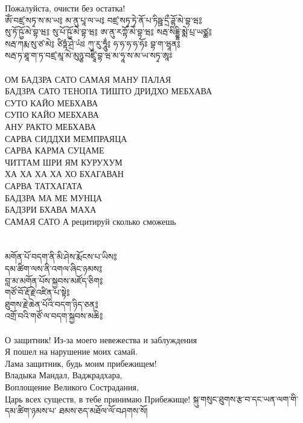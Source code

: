 Пожалуйста, очисти без остатка!\\
\ru
\newpage
\ti
ཨོཾ་བཛྲ་སཏྭ་ས་མ་ཡ༔ མ་ནུ་པཱ་ལ་ཡ༔ བཛྲ་སཏྭ་ཏྭེ་ནོ་པ་ཏིཥྛ་དྲྀ་ཌྷོ་མེ་བྷ་ཝ༔ \\
སུ་ཏོ་ཥྱོ་མེ་བྷ་ཝ༔ སུ་པོ་ཥྱོ་མེ་བྷ་ཝ༔ ཨ་ནུ་རཀྟོ་མེ་བྷ་ཝ༔ སརྦ་སིདྡྷི་མྨེ་པྲ་ཡཙྪ༔ \\
སརྦ་ཀརྨ་སུ་ཙ་མེ༔ ཙིཏྟཾ་ཤྲེ་ཡཾཿ ཀུ་རུ་ཧཱུྂ༔ ཧ་ཧ་ཧ་ཧ་ཧོཿ བྷ་ག་ཝཱན༔ \\
སརྦ་ཏ་ཐཱ་ག་ཏ་བཛྲ་མཱ་མེ་མུཉྩ་བཛྲཱི་བྷ་ཝ་མ་ཧཱ་ས་མ་ཡ་སཏྭ་ཨཱཿ\\
\\
\ru
ОМ БАДЗРА САТО САМАЯ МАНУ ПАЛАЯ\\
БАДЗРА САТО ТЕНОПА ТИШТО ДРИДХО МЕБХАВА\\
СУТО КАЙО МЕБХАВА\\
СУПО КАЙО МЕБХАВА\\
АНУ РАКТО МЕБХАВА\\
САРВА СИДДХИ МЕМПРАЯЦА\\
САРВА КАРМА СУЦАМЕ\\
ЧИТТАМ ШРИ ЯМ КУРУХУМ\\
ХА ХА ХА ХА ХО БХАГАВАН\\
САРВА ТАТХАГАТА\\
БАДЗРА МА МЕ МУНЦА\\
БАДЗРИ БХАВА МАХА\\
САМАЯ САТО А \hspace{2cm} \scriptsize рецитируй сколько сможешь \normalsize \\
\\
\\
\ti
མགོན་པོ་བདག་ནི་མི་ཤེས་རྨོངས་པ་ཡིས༔\\
དམ་ཚིག་ལས་ནི་འགལ་ཞིང་ཉམས༔ \\
བླ་མ་མགོན་པོས་སྐྱབས་མཛོད་ཅིག༔ \\
གཙོ་བོ་རྡོ་རྗེ་འཛིན་པ་སྟེ༔ \\
ཐུགས་རྗེ་ཆེན་པོའི་བདག་ཉིད་ཅན༔ \\
འགྲོ་བའི་གཙོ་ལ་བདག་སྐྱབས་མཆི༔\\
\\
\ru
О защитник! Из-за моего невежества и заблуждения\\
Я пошел на нарушение моих самай.\\
Лама защитник, будь моим прибежищем!\\
Владыка Мандал, Ваджрадхара,\\
Воплощение Великого Сострадания,\\
Царь всех существ, в тебе принимаю Прибежище!
\newpage
\ti
སྐུ་གསུང་ཐུགས་རྩ་བ་དང་ཡན་ལག་གི་དམ་ཚིག་ཉམས་པ་ ཐམས་ཅད་མཐོལ་ལོ་བཤགས་སོ། \\
